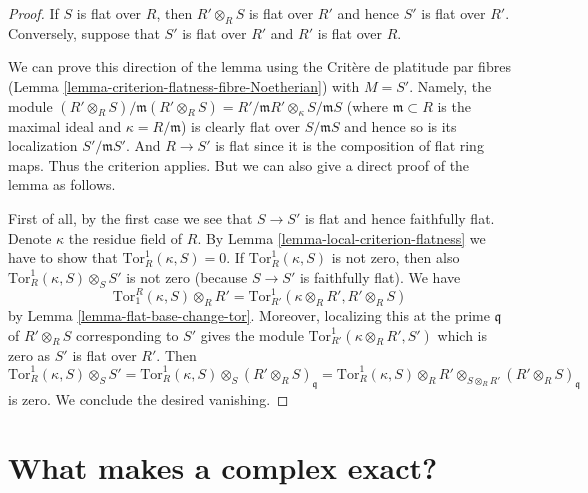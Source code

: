 \begin{proof}
If $S$ is flat over $R$, then $R' \otimes_R S$ is flat over $R'$
and hence $S'$ is flat over $R'$.
Conversely, suppose that
$S'$ is flat over $R'$ and $R'$ is flat over $R$.

\medskip\noindent
We can prove this direction of the lemma
using the Crit\`ere de platitude par fibres
(Lemma \ref{lemma-criterion-flatness-fibre-Noetherian}) with $M = S'$.
Namely, the module $(R' \otimes_R S)/\mathfrak m(R' \otimes_R S) =
R'/\mathfrak mR' \otimes_\kappa S/\mathfrak m S$ (where $\mathfrak m \subset R$
is the maximal ideal and $\kappa = R/\mathfrak m$) is clearly flat
over $S/\mathfrak m S$ and hence so is its localization $S'/\mathfrak mS'$.
And $R \to S'$ is flat since it is the composition of flat
ring maps. Thus the criterion applies.
But we can also give a direct proof of the lemma as follows.

\medskip\noindent
First of all, by the first case we see that $S \to S'$ is flat
and hence faithfully flat.
Denote $\kappa$ the residue field of $R$.
By Lemma \ref{lemma-local-criterion-flatness}
we have to show that $\text{Tor}^1_R(\kappa, S) = 0$.
If $\text{Tor}^1_R(\kappa, S)$ is not
zero, then also $\text{Tor}^1_R(\kappa, S) \otimes_S S'$ is not zero
(because $S \to S'$ is faithfully flat). We have
$$
\text{Tor}_1^R(\kappa, S) \otimes_R R'
=
\text{Tor}^1_{R'}(\kappa \otimes_R R', R' \otimes_R S)
$$
by Lemma \ref{lemma-flat-base-change-tor}.
Moreover, localizing this at the prime $\mathfrak q$ of
$R' \otimes_R S$ corresponding to $S'$ gives
the module $\text{Tor}^1_{R'}(\kappa \otimes_R R', S')$ which is zero
as $S'$ is flat over $R'$.
Then $\text{Tor}^1_R(\kappa, S) \otimes_S S'
= \text{Tor}^1_R(\kappa, S) \otimes_S (R' \otimes_R S)_{\mathfrak q}
= \text{Tor}^1_R(\kappa, S) \otimes_R R' \otimes_{S \otimes_R R'}
(R' \otimes_R S)_{\mathfrak q}$ is zero. We conclude the desired vanishing.
\end{proof}



















\section{What makes a complex exact?}
\label{section-complex-exact}

